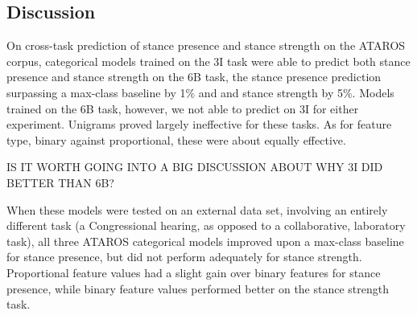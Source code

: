 \subsection{Discussion} 

On cross-task prediction of stance presence and stance strength on the ATAROS corpus, categorical models trained on the 3I task were able to predict both stance presence and stance strength on the 6B task, the stance presence prediction surpassing a max-class baseline by 1\% and and stance strength by 5\%.  Models trained on the 6B task, however, we not able to predict on 3I for either experiment.  Unigrams proved largely ineffective for these tasks.  As for feature type, binary against proportional, these were about equally effective.  

IS IT WORTH GOING INTO A BIG DISCUSSION ABOUT WHY 3I DID BETTER THAN 6B? 

When these models were tested on an external data set, involving an entirely different task (a Congressional hearing, as opposed to a collaborative, laboratory task), all three ATAROS categorical models improved upon a max-class baseline for stance presence, but did not perform adequately for stance strength.  Proportional feature values had a slight gain over binary features for stance presence, while binary feature values performed better on the stance strength task.  


